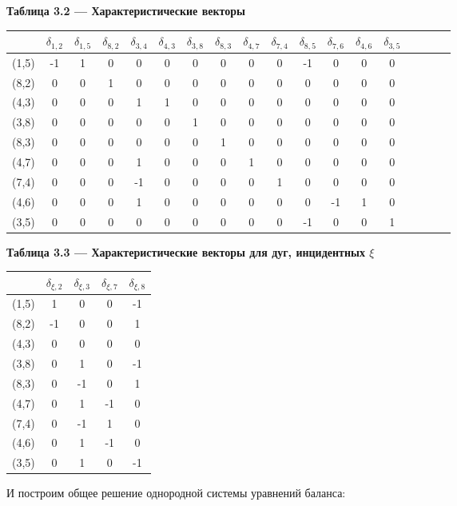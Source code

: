 \documentclass[14pt]{extarticle}%
\begin{document}
\begin{center}
\textbf{Таблица 3.2 --- Характеристические векторы }\\
\begin{tabular}{c|ccccccccccccccccc}
 &$\delta _{1,2}$ & $\delta _{1,5}$ & $\delta _{8,2}$ & $\delta _{3,4}$ & $\delta _{4,3}$ & $\delta _{3,8}$ & $\delta _{8,3}$ & $\delta _{4,7}$ & $\delta _{7,4}$ & $\delta _{8,5}$ & $\delta _{7,6}$ & $\delta _{4,6}$ & $\delta _{3,5}$\\\hline
 (1,5)& -1 & 1 & 0 & 0 & 0 & 0 & 0 & 0 & 0 & -1 & 0 & 0 & 0 \\
 (8,2)&0 & 0 & 1 & 0 & 0 & 0 & 0 & 0 & 0 & 0 & 0 & 0 & 0  \\
 (4,3)&0 & 0 & 0 & 1 & 1 & 0 & 0 & 0 & 0 & 0 & 0 & 0 & 0  \\
 (3,8)&0 & 0 & 0 & 0 & 0 & 1 & 0 & 0 & 0 & 0 & 0 & 0 & 0  \\
 (8,3)&0 & 0 & 0 & 0 & 0 & 0 & 1 & 0 & 0 & 0 & 0 & 0 & 0  \\
 (4,7)&0 & 0 & 0 & 1 & 0 & 0 & 0 & 1 & 0 & 0 & 0 & 0 & 0  \\
 (7,4)&0 & 0 & 0 & -1 & 0 & 0 & 0 & 0 & 1 & 0 & 0 & 0 & 0 \\
 (4,6)&0 & 0 & 0 & 1 & 0 & 0 & 0 & 0 & 0 & 0 & -1 & 1 & 0 \\
 (3,5)&0 & 0 & 0 & 0 & 0 & 0 & 0 & 0 & 0 & -1 & 0 & 0 & 1 \\
\end{tabular}
\end{center}
\begin{center}
\textbf{Таблица 3.3 --- Характеристические векторы для дуг, инцидентных $\xi$}\\
\begin{tabular}{c|cccc}
 &$\delta _{\xi, 2}$ & $\delta _{\xi, 3}$ & $\delta _{\xi, 7}$ & $\delta _{\xi, 8}$ \\\hline
 (1,5)&1 & 0 & 0 & -1 \\
 (8,2)&-1 & 0 & 0 & 1 \\
 (4,3)&0 & 0 & 0 & 0 \\
(3,8)& 0 & 1 & 0 & -1 \\
 (8,3)&0 & -1 & 0 & 1 \\
 (4,7)&0 & 1 & -1 & 0 \\
(7,4)&0 & -1 & 1 & 0 \\
(4,6)& 0 & 1 & -1 & 0 \\
(3,5)& 0 & 1 & 0 & -1 \\
\end{tabular}
\end{center}
И построим общее решение однородной системы уравнений баланса:
\end{document}
